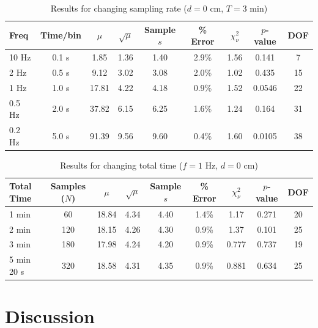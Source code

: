 \documentclass[letterpaper,12pt]{article}
\begin{document}
\begin{table}[htbp]
    \centering
    \caption{Results for changing sampling rate ($d = 0$ cm, $T = 3$ min)}
    \label{tab:sampling}
    \begin{tabular}{lcccccccc}
        \hline
        Freq & Time/bin & $\mu$ & $\sqrt{\mu}$ & Sample $s$ & \% Error & $\chi^2_\nu$ & $p$-value & DOF \\
        \hline
        10 Hz  & 0.1 s & 1.85  & 1.36 & 1.40 & 2.9\% & 1.56 & 0.141  & 7  \\
        2 Hz   & 0.5 s & 9.12  & 3.02 & 3.08 & 2.0\% & 1.02 & 0.435  & 15 \\
        1 Hz   & 1.0 s & 17.81 & 4.22 & 4.18 & 0.9\% & 1.52 & 0.0546 & 22 \\
        0.5 Hz & 2.0 s & 37.82 & 6.15 & 6.25 & 1.6\% & 1.24 & 0.164  & 31 \\
        0.2 Hz & 5.0 s & 91.39 & 9.56 & 9.60 & 0.4\% & 1.60 & 0.0105 & 38 \\
        \hline
    \end{tabular}
\end{table}

\begin{table}[htbp]
    \centering
    \caption{Results for changing total time ($f = 1$ Hz, $d = 0$ cm)}
    \label{tab:time}
    \begin{tabular}{lcccccccc}
        \hline
        Total Time & Samples ($N$) & $\mu$ & $\sqrt{\mu}$ & Sample $s$ & \% Error & $\chi^2_\nu$ & $p$-value & DOF \\
        \hline
        1 min    & 60  & 18.84 & 4.34 & 4.40 & 1.4\% & 1.17  & 0.271 & 20 \\
        2 min    & 120 & 18.15 & 4.26 & 4.30 & 0.9\% & 1.37  & 0.101 & 25 \\
        3 min    & 180 & 17.98 & 4.24 & 4.20 & 0.9\% & 0.777 & 0.737 & 19 \\
        5 min 20 s & 320 & 18.58 & 4.31 & 4.35 & 0.9\% & 0.881 & 0.634 & 25 \\
        \hline
    \end{tabular}
\end{table}



\section{Discussion}
\end{document}
